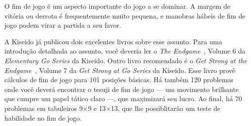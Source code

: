 O fim de jogo é um aspecto importante do jogo a se dominar. A margem de vitória ou derrota é frequentemente muito pequena, e manobras hábeis de fim de jogo podem virar a partida a seu favor.

A Kiseido já publicou dois excelentes livros sobre esse assunto. Para uma introdução detalhada ao assunto, você deveria ler o \emph{The Endgame}~\cite{tomoko_bozulich_endgame}, Volume 6 da \emph{Elementary Go Series} da Kiseido. Outro livro recomendado é o \emph{Get Strong at the Endgame}~\cite{bozulich_endgame}, Volume 7 da \emph{Get Strong at Go Series} da Kiseido. Esse livro provê cálculos de fim de jogo para 101 posições básicas. Há também 120 problemas onde você deverá encontrar o tesuji de fim de jogo --- um movimento brilhante que cumpre um papel tático claro ---, que maximizará seu lucro. Ao final, há 70 problemas em tabuleiros 9\(\times\)9 e 13\(\times\)13, que lhe possiblitarão um teste de habilidade no fim de jogo.